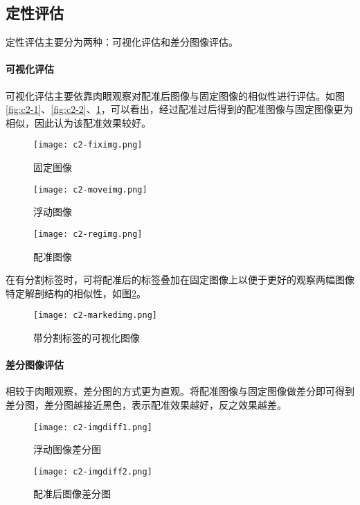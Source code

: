 \subsection{定性评估}

定性评估主要分为两种：可视化评估和差分图像评估。

\paragraph{可视化评估}

可视化评估主要依靠肉眼观察对配准后图像与固定图像的相似性进行评估。如图\ref{fig:c2-1}、\ref{fig:c2-2}、\ref{fig:c2-3}，可以看出，经过配准过后得到的配准图像与固定图像更为相似，因此认为该配准效果较好。

\begin{figure}[h]
    \centering
    \begin{minipage}{0.3\textwidth}
        \texttt{[image: c2-fiximg.png]}
        \caption{固定图像}
        \label{fig:c2-1}
    \end{minipage}
    \begin{minipage}{0.3\textwidth}
        \texttt{[image: c2-moveimg.png]}
        \caption{浮动图像}
        \label{fig:c2-2}
    \end{minipage}
    \begin{minipage}{0.3\textwidth}
        \texttt{[image: c2-regimg.png]}
        \caption{配准图像}
        \label{fig:c2-3}
    \end{minipage}
\end{figure}

在有分割标签时，可将配准后的标签叠加在固定图像上以便于更好的观察两幅图像特定解剖结构的相似性，如图\ref{fig:c2-4}。

\begin{figure}[h]
    \centering
    \texttt{[image: c2-markedimg.png]}
    \caption{带分割标签的可视化图像}
    \label{fig:c2-4}
\end{figure}

\paragraph{差分图像评估}

相较于肉眼观察，差分图的方式更为直观。将配准图像与固定图像做差分即可得到差分图，差分图越接近黑色，表示配准效果越好，反之效果越差。

\begin{figure}[h]
    \centering
    \begin{minipage}{0.4\textwidth}
        \texttt{[image: c2-imgdiff1.png]}
        \caption{浮动图像差分图}
        \label{fig:c2-5}
    \end{minipage}
    \begin{minipage}{0.4\textwidth}
        \texttt{[image: c2-imgdiff2.png]}
        \caption{配准后图像差分图}
        \label{fig:c2-6}
    \end{minipage}
\end{figure}

